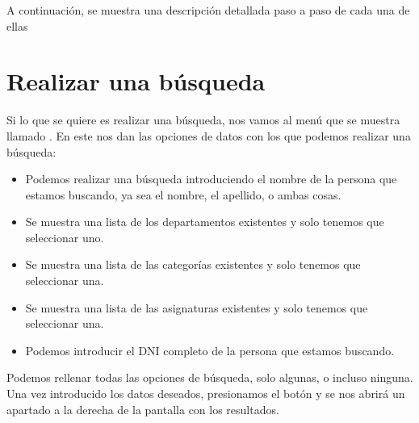 \documentclass[letterpaper,10pt,spanish]{sphinxmanual}
\begin{document}
\sphinxAtStartPar
A continuación, se muestra una descripción detallada paso a paso de cada una de ellas


\section{Realizar una búsqueda}
\label{\detokenize{documentos/ejecucion:realizar-una-busqueda}}
\sphinxAtStartPar
Si lo que se quiere es realizar una búsqueda, nos vamos al menú que
se muestra llamado . En este nos dan las opciones de datos con los que podemos realizar una búsqueda:
\begin{itemize}
\item {} 
\sphinxAtStartPar
{} Podemos realizar una búsqueda introduciendo el nombre de la persona que estamos buscando, ya sea el nombre, el apellido, o ambas cosas.

\item {} 
\sphinxAtStartPar
{} Se muestra una lista de los departamentos existentes y solo tenemos que seleccionar uno.

\item {} 
\sphinxAtStartPar
{} Se muestra una lista de las categorías existentes y solo tenemos que seleccionar una.

\item {} 
\sphinxAtStartPar
{} Se muestra una lista de las asignaturas existentes y solo tenemos que seleccionar una.

\item {} 
\sphinxAtStartPar
{} Podemos introducir el DNI completo de la persona que estamos buscando.

\end{itemize}

\sphinxAtStartPar
Podemos rellenar todas las opciones de búsqueda, solo algunas, o incluso ninguna. Una vez introducido los datos deseados,
presionamos el botón  y se nos abrirá un apartado a la derecha de la pantalla con los resultados.
\end{document}
